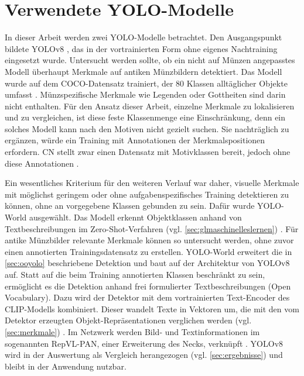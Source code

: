 \section{Verwendete YOLO-Modelle}
\label{sec:modelle}
In dieser Arbeit werden zwei YOLO-Modelle betrachtet. Den Ausgangspunkt bildete YOLOv8 \cite{jocher2023yolov8}, das in der vortrainierten Form ohne eigenes Nachtraining eingesetzt wurde. Untersucht werden sollte, ob ein nicht auf Münzen angepasstes Modell überhaupt Merkmale auf antiken Münzbildern detektiert. Das Modell wurde auf dem COCO-Datensatz \cite{lin2014microsoft} trainiert, der 80 Klassen alltäglicher Objekte umfasst \cite{ultralytics-yolov8}. Münzspezifische Merkmale wie Legenden oder Gottheiten sind darin nicht enthalten. Für den Ansatz dieser Arbeit, einzelne Merkmale zu lokalisieren und zu vergleichen, ist diese feste Klassenmenge eine Einschränkung, denn ein solches Modell kann nach den Motiven nicht gezielt suchen. Sie nachträglich zu ergänzen, würde ein Training mit Annotationen der Merkmalspositionen erfordern. CN stellt zwar einen Datensatz mit Motivklassen bereit, jedoch ohne diese Annotationen \cite{cn-object-detection-dataset}.

Ein wesentliches Kriterium für den weiteren Verlauf war daher, visuelle Merkmale mit möglichst geringem oder ohne aufgabenspezifisches Training detektieren zu können, ohne an vorgegebene Klassen gebunden zu sein. Dafür wurde YOLO-World \cite{cheng2024yoloworld} ausgewählt. Das Modell erkennt Objektklassen anhand von Textbeschreibungen im Zero-Shot-Verfahren (vgl. \cref{sec:glmaschinelleslernen}) \cite{cheng2024yoloworld,ultralytics-yoloworld}. Für antike Münzbilder relevante Merkmale können so untersucht werden, ohne zuvor einen annotierten Trainingsdatensatz zu erstellen. YOLO-World erweitert die in \cref{sec:ooyolo} beschriebene Detektion und baut auf der Architektur von YOLOv8 auf. Statt auf die beim Training annotierten Klassen beschränkt zu sein, ermöglicht es die Detektion anhand frei formulierter Textbeschreibungen (Open Vocabulary). Dazu wird der Detektor mit dem vortrainierten Text-Encoder des CLIP-Modells \cite{radford2021learning} kombiniert. Dieser wandelt Texte in Vektoren um, die mit den vom Detektor erzeugten Objekt-Repräsentationen verglichen werden (vgl. \cref{sec:merkmale}) \cite{cheng2024yoloworld}. Im Netzwerk werden Bild- und Textinformationen im sogenannten RepVL-PAN, einer Erweiterung des Necks, verknüpft \cite{cheng2024yoloworld}. YOLOv8 wird in der Auswertung als Vergleich herangezogen (vgl. \cref{sec:ergebnisse}) und bleibt in der Anwendung nutzbar.

